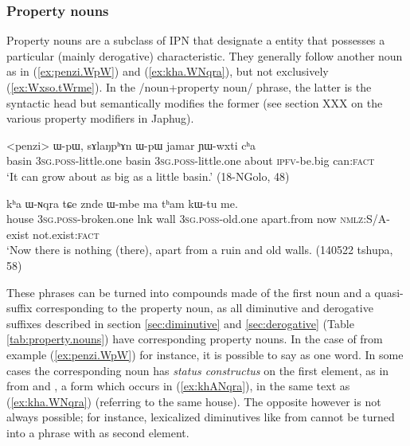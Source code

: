 \subsubsection{Property nouns} \label{sec:property.nouns}
Property nouns are a subclass of IPN that designate a entity that possesses a particular (mainly derogative) characteristic. They generally follow another noun as in (\ref{ex:penzi.WpW}) and (\ref{ex:kha.WNqra}), but not exclusively (\ref{ex:Wxso.tWrme}). In the /noun+property noun/ phrase, the latter is the syntactic head but semantically modifies the former (see section XXX on the various property modifiers in Japhug).  

\begin{exe}
\ex \label{ex:penzi.WpW}
 \gll <penzi> ɯ-pɯ, sɤlaŋpʰɤn ɯ-pɯ jamar ɲɯ-wxti cʰa  \\
 basin \textsc{3sg.poss}-little.one   basin \textsc{3sg.poss}-little.one  about \textsc{ipfv}-be.big can:\textsc{fact} \\
 \glt `It can grow about as big as a little basin.' (18-NGolo, 48)
\end{exe}

\begin{exe}
\ex \label{ex:kha.WNqra}
 \gll
kʰa ɯ-ɴqra tɕe znde ɯ-mbe ma tʰam kɯ-tu me. \\
house \textsc{3sg.poss}-broken.one lnk wall \textsc{3sg.poss}-old.one apart.from now \textsc{nmlz}:S/A-exist not.exist:\textsc{fact} \\ 
\glt `Now there is nothing (there), apart from a ruin and old walls. (140522 tshupa, 58)
\end{exe}

These phrases can be turned into compounds made of the first noun and a quasi-suffix corresponding to the property noun, as all diminutive and derogative suffixes described in section \ref{sec:diminutive} and \ref{sec:derogative} (Table \ref{tab:property.nouns}) have corresponding property nouns. In the case of   from example (\ref{ex:penzi.WpW}) for instance, it is possible to say  as one word. In some cases the corresponding noun has \textit{status constructus} on the first element, as in  from  and , a form which occurs in (\ref{ex:khANqra}), in the same text as  (\ref{ex:kha.WNqra}) (referring to the same house). The opposite however is not always possible; for instance, lexicalized diminutives like  from  cannot be turned into a phrase with  as second element.

